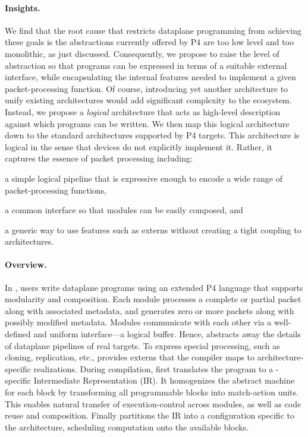 \documentclass[letterpaper,twocolumn,10pt]{article}
\begin{document}
\paragraph*{Insights.}
%
We find that the root cause that restricts dataplane programming from
achieving these goals is the abstractions currently offered by P4 are
too low level and too monolithic, as just discussed. Consequently, we
propose to raise the level of abstraction so that programs can be
expressed in terms of a suitable external interface, while
encapsulating the internal features needed to implement a given
packet-processing function. Of course, introducing yet another
architecture to unify existing architectures would add significant
complexity to the ecosystem. Instead, we propose a \emph{logical}
architecture that acts as high-level description against which
programs can be written. We then map this logical architecture down to
the standard architectures supported by P4 targets. This architecture
is logical in the sense that devices do not explicitly implement it.
Rather, it captures the essence of packet processing including:
\begin{enumerate*}[label=(\roman*)]
  \item a simple logical pipeline that is expressive enough to encode a
    wide range of packet-processing functions,
  \item a common interface so that modules can be easily composed, and
  \item a generic way to use features such as externs
    without creating a tight coupling to architectures.
\end{enumerate*}

\paragraph*{Overview.} 
%
In \ulang, users write dataplane programs using an extended P4
language that supports modularity and composition. Each module
processes a complete or partial packet along with associated metadata,
and generates zero or more packets along with possibly modified
metadata. Modules communicate with each other via a well-defined and
uniform interface---a logical buffer. Hence, \ulang abstracts away the
details of dataplane pipelines of real targets. To express special
processing, such as cloning, replication, etc., \ulang provides
externs that the compiler maps to architecture-specific realizations.
During compilation, \ucomp first translates the program to a
\uarch-specific Intermediate Representation (IR). It homogenizes the
abstract machine for each block by transforming all programmable
blocks into match-action units. This enables natural transfer of
execution-control across modules, as well as code reuse and
composition. Finally \ucomp partitions the IR into a configuration
specific to the architecture, scheduling computation onto the
available blocks.
\end{document}
